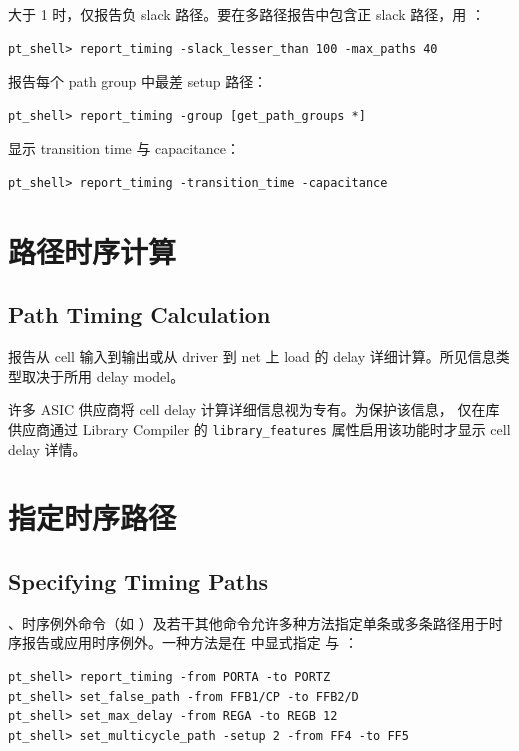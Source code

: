  大于 1 时，仅报告负 slack 路径。要在多路径报告中包含正 slack 路径，用 ：
\begin{lstlisting}
pt_shell> report_timing -slack_lesser_than 100 -max_paths 40
\end{lstlisting}

报告每个 path group 中最差 setup 路径：
\begin{lstlisting}
pt_shell> report_timing -group [get_path_groups *]
\end{lstlisting}

显示 transition time 与 capacitance：
\begin{lstlisting}
pt_shell> report_timing -transition_time -capacitance
\end{lstlisting}

\section{路径时序计算}
\subsection*{Path Timing Calculation}

 报告从 cell 输入到输出或从 driver 到 net 上 load 的 delay 详细计算。所见信息类型取决于所用 delay model。

许多 ASIC 供应商将 cell delay 计算详细信息视为专有。为保护该信息， 仅在库供应商通过 Library Compiler 的 \texttt{library\_features} 属性启用该功能时才显示 cell delay 详情。

\section{指定时序路径}
\subsection*{Specifying Timing Paths}

、时序例外命令（如 ）及若干其他命令允许多种方法指定单条或多条路径用于时序报告或应用时序例外。一种方法是在  中显式指定  与 ：
\begin{lstlisting}
pt_shell> report_timing -from PORTA -to PORTZ
pt_shell> set_false_path -from FFB1/CP -to FFB2/D
pt_shell> set_max_delay -from REGA -to REGB 12
pt_shell> set_multicycle_path -setup 2 -from FF4 -to FF5
\end{lstlisting}

